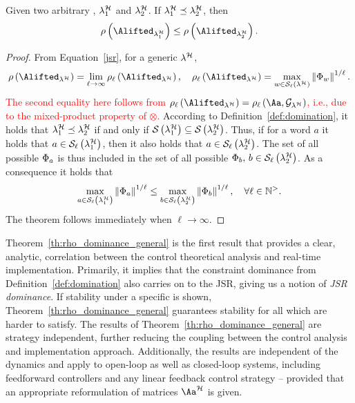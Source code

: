 \begin{theorem}%
    \label{th:rho_dominance_general}%
    Given two arbitrary \ewhc{}, $\lambda_1^{\mathcal{H}}$ and $\lambda_2^{\mathcal{H}}$.
    If $\lambda_1^{\mathcal{H}} \preceq \lambda_2^{\mathcal{H}}$, then
    \begin{equation*}
        \rho\funof{\Alifted_{\lambda_1^\strat}} \leq \rho\funof{\Alifted_{\lambda_2^\strat}}.
    \end{equation*}

    \begin{proof}
        From Equation~\eqref{jsr}, for a generic \ewhc{} $\lambda^{\mathcal{H}}$,
        \begin{equation*}
            \rho\funof{\Alifted_{\lambda^\strat}} = \lim_{\ell\rightarrow \infty}\rho_\ell\funof{\Alifted_{\lambda^\strat}}, \quad \rho_\ell\funof{\Alifted_{\lambda^\strat}} = \max_{w \in \sset{\ell}{\lambda^\strat}}\norm{\clmat{}_{w}}^{1/\ell}.
        \end{equation*}
        \textcolor{red}{The second equality here follows from $\rho_\ell\funof{\Alifted_{\lambda^\strat}} = \rho_{\ell}\funof{\Aa, \GG{\lambda^\strat}}$, i.e., due to the mixed-product property of $\otimes$.}
        According to Definition~\ref{def:domination}, it holds that $\lambda^{\mathcal{H}}_1 \preceq \lambda^{\mathcal{H}}_2$ if and only if $\mathcal{S}_{}\left( \lambda^{\mathcal{H}}_1 \right) \subseteq \mathcal{S}_{}\left( \lambda^{\mathcal{H}}_2 \right)$.
        Thus, if for a word $a$ it holds that $a \in \mathcal{S}_{\ell}\left( \lambda^{\mathcal{H}}_1 \right)$, then it also holds that $a \in \mathcal{S}_{\ell}\left( \lambda^{\mathcal{H}}_2 \right)$.
        The set of all possible $\Phi{}_{a}$ is thus included in the set of all possible $\Phi{}_{b},\, b \in \mathcal{S}_{\ell}\left( \lambda^{\mathcal{H}}_2 \right)$.
        As a consequence it holds that
        \begin{equation*}
            \max_{a \in \mathcal{S}_{\ell}\left( \lambda^{\mathcal{H}}_1 \right)}\left\lVert\Phi{}_{a}\right\rVert^{1/\ell} \leq
            \max_{b \in \mathcal{S}_{\ell}\left( \lambda^{\mathcal{H}}_2 \right)}\left\lVert\Phi{}_{b}\right\rVert^{1/\ell}, \quad
            \forall \ell\in\mathbb{N}^{>}.
        \end{equation*}
        The theorem follows immediately when $\ell\rightarrow \infty$.
    \end{proof}
\end{theorem}

Theorem~\ref{th:rho_dominance_general} is the first result that provides a clear, analytic, correlation between the control theoretical analysis and real-time implementation.
Primarily, it implies that the constraint dominance from Definition~\ref{def:domination} also carries on to the JSR, giving us a notion of \emph{JSR dominance}.
If stability under a specific \ewhc{} is shown, Theorem~\ref{th:rho_dominance_general} guarantees stability for all \ewhc{} which are harder to satisfy.
The results of Theorem~\ref{th:rho_dominance_general} are strategy independent, further reducing the coupling between the control analysis and implementation approach.
Additionally, the results are independent of the dynamics and apply to open-loop as well as closed-loop systems, including feedforward controllers and any linear feedback control strategy -- provided that an appropriate reformulation of matrices $\Aa^\strat$ is given.

